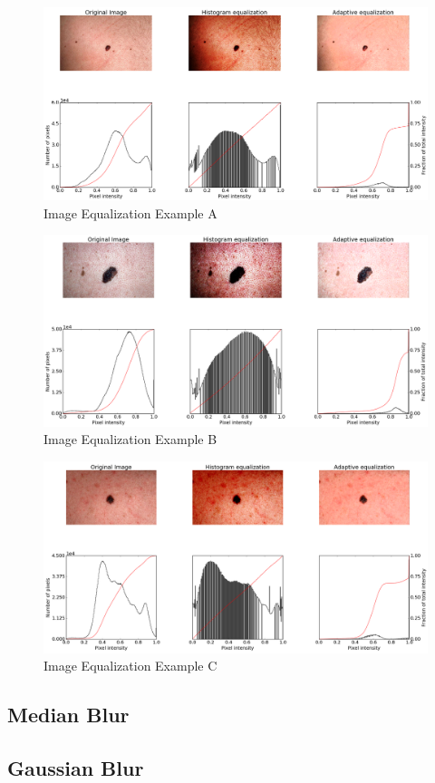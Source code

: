 \begin{figure}[H]
    \includegraphics[width=\textwidth,keepaspectratio]{assets/image_processing/equalization/figure_01.png}
    \caption{Image Equalization Example A}
    \label{fig:eq_A}
\end{figure}
\begin{figure}[H]
    \includegraphics[width=\textwidth,keepaspectratio]{assets/image_processing/equalization/figure_02.png}
    \caption{Image Equalization Example B}
    \label{fig:eq_A}
\end{figure}
\begin{figure}[H]
    \includegraphics[width=\textwidth,keepaspectratio]{assets/image_processing/equalization/figure_03.png}
    \caption{Image Equalization Example C}
    \label{fig:eq_A}
\end{figure}

\subsection{Median Blur}
\subsection{Gaussian Blur}